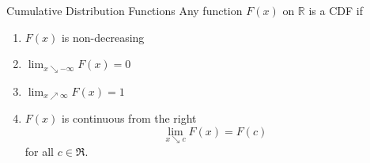 %
% 


\begin{frame}
  \begin{block}{Cumulative Distribution Functions}
    Any function $F(x)$ on $\mathbb R$ is a CDF if
    \begin{enumerate}
    \item $F(x)$ is non-decreasing
    \item $\lim_{x \searrow -\infty}F(x)=0$
    \item $\lim_{x \nearrow \infty}F(x)=1$
    \item $F(x)$ is continuous from the right
      \[
        \lim_{x \searrow c} F(x)=F(c)
      \]
      for all $c \in \Re$.
    \end{enumerate}

  \end{block}
\end{frame}

